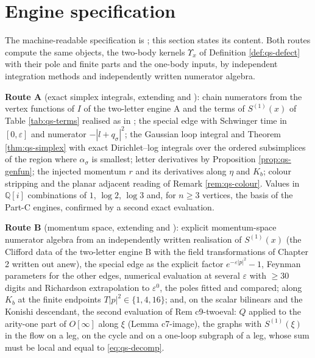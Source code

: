 \section{Engine specification}
\label{sec:qs-engines}

The machine-readable specification is ; this section states its content. Both routes compute the same objects, the two-body kernels $\Upsilon_x$ of Definition \ref{def:qs-defect} with their pole and finite parts and the one-body inputs, by independent integration methods and independently written numerator algebra.

\textbf{Route A} (exact simplex integrals, extending  and ): chain numerators from the vertex functions of $I$ of the two-letter engine A and the terms of $S^{(1)}(x)$ of Table \ref{tab:qs-terms} realised as in ; the special edge with Schwinger time in $[0,\varepsilon]$ and numerator $-|l+q_\sigma|^2$; the Gaussian loop integral and Theorem \ref{thm:qs-simplex} with exact Dirichlet--log integrals over the ordered subsimplices of the region where $\alpha_\sigma$ is smallest; letter derivatives by Proposition \ref{prop:qs-genfun}; the injected momentum $r$ and its derivatives along $\eta$ and $K_b$; colour stripping and the planar adjacent reading of Remark \ref{rem:qs-colour}. Values in $\mathbb Q[i]$ combinations of $1$, $\log2$, $\log3$ and, for $n\ge3$ vertices, the basis of the Part-C engines, confirmed by a second exact evaluation.

\textbf{Route B} (momentum space, extending  and ): explicit momentum-space numerator algebra from an independently written realisation of $S^{(1)}(x)$ (the Clifford data of the two-letter engine B with the field transformations of Chapter 2 written out anew), the special edge as the explicit factor $e^{-\varepsilon|p|^2}-1$, Feynman parameters for the other edges, numerical evaluation at several $\varepsilon$ with $\ge30$ digits and Richardson extrapolation to $\varepsilon^0$, the poles fitted and compared; along $K_b$ at the finite endpoints $T|p|^2\in\{1,4,16\}$; and, on the scalar bilinears and the Konishi descendant, the second evaluation of Rem c9-twoeval: $Q$ applied to the arity-one part of $O[\infty]$ along $\xi$ (Lemma c7-image), the graphs with $S^{(1)}(\xi)$ in the flow on a leg, on the cycle and on a one-loop subgraph of a leg, whose sum must be local and equal to \eqref{eq:qs-decomp}.

